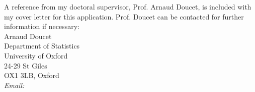 \documentclass[12pt,a4paper]{article}
\begin{document}
A reference from my doctoral supervisor, Prof. Arnaud Doucet, is included with my cover
letter for this application. Prof. Doucet can be contacted for further information if
necessary: \\

\noindent
Arnaud Doucet  \\
Department of Statistics \\
University of Oxford \\
24-29 St Giles \\
OX1 3LB, Oxford \\
\textit{Email:} 
\end{document}
